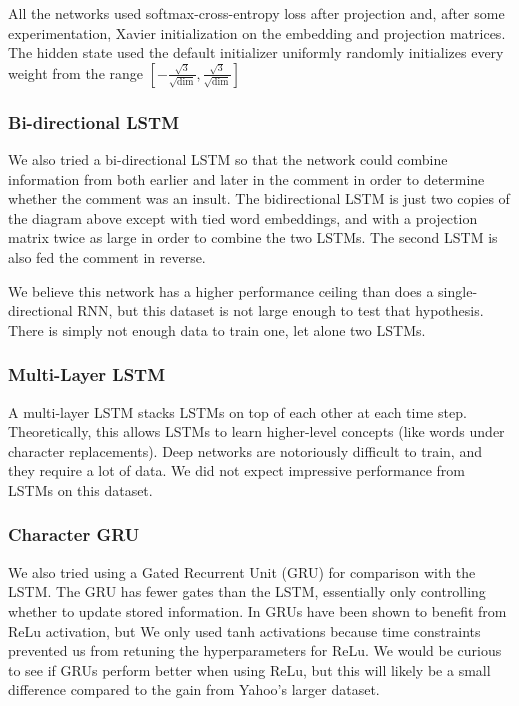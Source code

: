 \documentclass{article} %
\begin{document}
All the networks used softmax-cross-entropy loss after projection and, after some experimentation, Xavier initialization on the embedding and projection matrices. The hidden state used the default initializer uniformly randomly initializes every weight from the range $[-\frac{\sqrt{3}}{\sqrt{\text{dim}}}, \frac{\sqrt{3}}{\sqrt{\text{dim}}}]$

\subsubsection*{Bi-directional LSTM}
We also tried a bi-directional LSTM so that the network could combine information from both earlier and later in the comment in order to determine whether the comment was an insult. The bidirectional LSTM is just two copies of the diagram above except with tied word embeddings, and with a projection matrix twice as large in order to combine the two LSTMs. The second LSTM is also fed the comment in reverse.

We believe this network has a higher performance ceiling than does a single-directional RNN, but this dataset is not large enough to test that hypothesis. There is simply not enough data to train one, let alone two LSTMs. 

\subsubsection*{Multi-Layer LSTM}
A multi-layer LSTM stacks LSTMs on top of each other at each time step. Theoretically, this allows LSTMs to learn higher-level concepts (like words under character replacements). Deep networks are notoriously difficult to train, and they require a lot of data. We did not expect impressive performance from LSTMs on this dataset. 

\subsubsection*{Character GRU}
We also tried using a Gated Recurrent Unit (GRU) for comparison with the LSTM. The GRU has fewer gates than the LSTM, essentially only controlling whether to update stored information. In GRUs have been shown to benefit from ReLu activation, but We only used tanh activations because time constraints prevented us from retuning the hyperparameters for ReLu. We would be curious to see if GRUs perform better when using ReLu, but this will likely be a small difference compared to the gain from Yahoo's larger dataset. 
\end{document}
